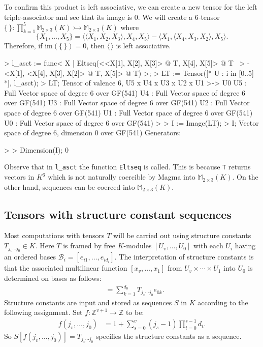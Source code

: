 \begin{example}[BBTripleProduct]
To confirm this product is left associative, we can create a new tensor for the left triple-associator and see that its image is $0$.
We will create a $6$-tensor $\{ \, \} : \prod_{k=1}^5 \mathbb{M}_{2\times 3}(K)\rightarrowtail \mathbb{M}_{2\times 3}(K)$ where
\[ \{ X_1,\dots, X_5\} = \langle \langle X_1, X_2, X_3 \rangle, X_4, X_5\rangle - \langle X_1, \langle X_4, X_3, X_2\rangle, X_5\rangle. \]
Therefore, if im$(\{ \, \})=0$, then $\langle \,\rangle$ is left associative. 

\begin{code}
> l_asct := func< X | Eltseq(<<X[1], X[2], X[3]> @ T, X[4], X[5]> @ T \
>     - <X[1], <X[4], X[3], X[2]> @ T, X[5]> @ T) >;
> LT := Tensor([* U : i in [0..5] *], l_asct);
> LT;
Tensor of valence 6, U5 x U4 x U3 x U2 x U1 >-> U0
U5 : Full Vector space of degree 6 over GF(541)
U4 : Full Vector space of degree 6 over GF(541)
U3 : Full Vector space of degree 6 over GF(541)
U2 : Full Vector space of degree 6 over GF(541)
U1 : Full Vector space of degree 6 over GF(541)
U0 : Full Vector space of degree 6 over GF(541)
> 
> I := Image(LT);
> I;
Vector space of degree 6, dimension 0 over GF(541)
Generators:

> 
> Dimension(I);
0
\end{code}

Observe that in {\tt l\_asct} the function {\tt Eltseq} is called. 
This is because {\tt T} returns vectors in $K^6$ which is not naturally coercible by Magma into $\mathbb{M}_{2\times 3}(K)$. 
On the other hand, sequences can be coerced into $\mathbb{M}_{2\times 3}(K)$. 
\end{example}




\subsection{Tensors with structure constant sequences}
Most computations with tensors $T$ will be carried out using structure constants
$T_{j_v\cdots j_0}\in K$.  Here $T$ is framed by free $K$-modules $[U_v,\dots,U_0]$ 
with each $U_i$ having an ordered bases $\mathcal{B}_i=[e_{i1},\dots,e_{id_i}]$.
The interpretation of structure constants is that the associated multilinear function 
$[x_v,\dots,x_1]$ from $U_v\times \cdots \times U_1$ into $U_0$ is determined on 
bases as follows:
\begin{align*}
	[e_{vj_v},\dots,e_{1j_1} ]& = \sum_{k=1}^{d_0} T_{j_v \cdots j_0} e_{0k}.
\end{align*}
Structure constants are input and stored as sequences $S$ in $K$ according to the
following assignment. Set $f:\mathbb{Z}^{v+1}\to \mathbb{Z}$ to be:
\begin{align*}
		 f(j_v,\dots,j_0) & = 1+\sum_{s=0}^v (j_s-1)\prod_{t=0}^{s-1} d_t.
\end{align*}
So $S[f(j_v,\dots,j_0)]=T_{j_v\cdots j_0}$ specifies the structure constants as a sequence.  
\smallskip

